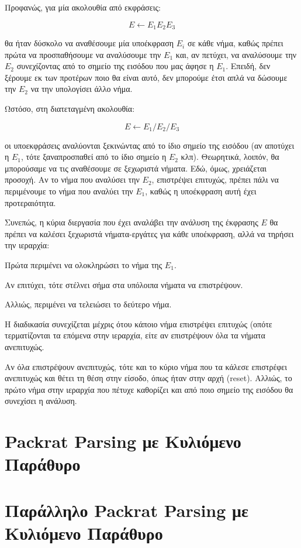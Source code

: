 Προφανώς, για μία ακολουθία από εκφράσεις:

\begin{equation}
	E \leftarrow E_1 E_2 E_3
\end{equation}

θα ήταν δύσκολο να αναθέσουμε μία υποέκφραση $E_i$ σε κάθε νήμα, καθώς πρέπει πρώτα να προσπαθήσουμε να αναλύσουμε την $E_1$ και, αν πετύχει, να αναλύσουμε την $E_2$ συνεχίζοντας από το σημείο της εισόδου που μας άφησε η $E_1$. 
Επειδή, δεν ξέρουμε εκ των προτέρων ποιο θα είναι αυτό, δεν μπορούμε έτσι απλά να δώσουμε την $E_2$ να την υπολογίσει άλλο νήμα.

Ωστόσο, στη διατεταγμένη ακολουθία:

\begin{equation}
	E \leftarrow E_1 / E_2 /  E_3
\end{equation}

οι υποεκφράσεις αναλύονται ξεκινώντας από το ίδιο σημείο της εισόδου (αν αποτύχει η $E_1$, τότε ξαναπροσπαθεί από το ίδιο σημείο η $E_2$ κλπ).
Θεωρητικά, λοιπόν, θα μπορούσαμε να τις αναθέσουμε σε ξεχωριστά νήματα.
Εδώ, όμως, χρειάζεται προσοχή.
Αν το νήμα που αναλύσει την $E_2$, επιστρέψει επιτυχώς, πρέπει πάλι να περιμένουμε το νήμα που αναλύει την $E_1$, καθώς η υποέκφραση αυτή έχει προτεραιότητα.

Συνεπώς, η κύρια διεργασία που έχει αναλάβει την ανάλυση της έκφρασης $E$ θα πρέπει να καλέσει ξεχωριστά νήματα-εργάτες για κάθε υποέκφραση, αλλά να τηρήσει την ιεραρχία:

\begin{description}[font=$\bullet$\scshape\bfseries]
	\item Πρώτα περιμένει να ολοκληρώσει το νήμα της $E_1$.
	\item Αν επιτύχει, τότε στέλνει σήμα στα υπόλοιπα νήματα να επιστρέψουν.
	\item Αλλιώς, περιμένει να τελειώσει το δεύτερο νήμα.
	\item Η διαδικασία συνεχίζεται μέχρις ότου κάποιο νήμα επιστρέψει επιτυχώς (οπότε τερματίζονται τα 
			επόμενα στην ιεραρχία, είτε αν επιστρέψουν όλα τα νήματα ανεπιτυχώς. %
\end{description}

Αν όλα επιστρέψουν ανεπιτυχώς, τότε και το κύριο νήμα που τα κάλεσε επιστρέφει ανεπιτυχώς και θέτει τη θέση στην είσοδο, όπως ήταν στην αρχή (reset).
Αλλιώς, το πρώτο νήμα στην ιεραρχία που πέτυχε καθορίζει και από ποιο σημείο της εισόδου θα συνεχίσει η ανάλυση.

\section{Packrat Parsing με Κυλιόμενο Παράθυρο}

\section{Παράλληλο Packrat Parsing με Κυλιόμενο Παράθυρο}
